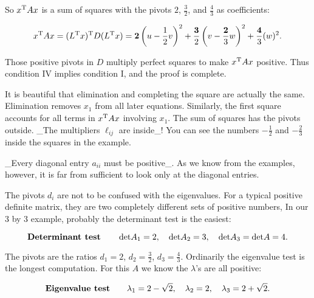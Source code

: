 So \(x^{\rm T}Ax\) is a sum of squares with the pivots \(2\), \(\frac{3}{2}\), and \(\frac{4}{3}\) as coefficients:

\[x^{\rm T}Ax=(L^{\rm T}x)^{\rm T}D(L^{\rm T}x)=\mathbf{2}\left(u-\frac{1}{2}v \right)^{2}+\frac{\mathbf{3}}{2}\left(v-\frac{\mathbf{2}}{3}w\right)^{2}+ \frac{\mathbf{4}}{3}(w)^{2}.\]

Those positive pivots in \(D\) multiply perfect squares to make \(x^{\rm T}Ax\) positive. Thus condition IV implies condition I, and the proof is complete.

It is beautiful that elimination and completing the square are actually the same. Elimination removes \(x_{1}\) from all later equations. Similarly, the first square accounts for all terms in \(x^{\rm T}Ax\) involving \(x_{1}\). The sum of squares has the pivots outside. _The multipliers \(\ell_{ij}\) are inside_! You can see the numbers \(-\frac{1}{2}\) and \(-\frac{2}{3}\) inside the squares in the example.

_Every diagonal entry \(a_{ii}\) must be positive_. As we know from the examples, however, it is far from sufficient to look only at the diagonal entries.

The pivots \(d_{i}\) are not to be confused with the eigenvalues. For a typical positive definite matrix, they are two completely different sets of positive numbers, In our 3 by 3 example, probably the determinant test is the easiest:

\[\text{\bf Determinant test}\qquad\det\!A_{1}=2,\quad\det\!A_{2}=3,\quad\det\!A_ {3}=\det\!A=4.\]

The pivots are the ratios \(d_{1}=2\), \(d_{2}=\frac{3}{2}\), \(d_{3}=\frac{4}{3}\). Ordinarily the eigenvalue test is the longest computation. For this \(A\) we know the \(\lambda\)'s are all positive:

\[\text{\bf Eigenvalue test}\qquad\lambda_{1}=2-\sqrt{2},\quad\lambda_{2}=2, \quad\lambda_{3}=2+\sqrt{2}.\] 